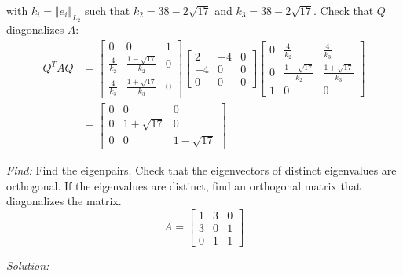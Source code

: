 \documentclass[11pt]{homework}
\begin{document}
with $k_i = \Vert e_i \Vert_{L_2}$
such that $k_2 = 38 -2 \sqrt{17}$ and
$k_3 = 38 - 2 \sqrt{17}$.
Check that $Q$ diagonalizes $A$:
\begin{align*}
Q^T A Q &=
  \begin{bmatrix}
  0 & 0 & 1 \\
  \frac{4}{k_2} & \frac{1-\sqrt{17}}{k_2} & 0 \\
  \frac{4}{k_3} & \frac{1+\sqrt{17}}{k_3} & 0 
  \end{bmatrix}
  \begin{bmatrix}
  2 & -4 & 0 \\
  -4 & 0 & 0 \\
  0 &  0 & 0
  \end{bmatrix}
  \begin{bmatrix}
  0 & \frac{4}{k_2}           & \frac{4}{k_3} \\
  0 & \frac{1- \sqrt{17}}{k_2} & \frac{1+\sqrt{17}}{k_3} \\
  1 & 0 & 0
  \end{bmatrix} \\
  &=
  \begin{bmatrix}
  0 & 0 & 0 \\
  0 & 1+\sqrt{17} & 0 \\
  0 & 0 & 1-\sqrt{17}
  \end{bmatrix}
\end{align*}

\newpage
\question
\emph{Find:}
\newline
Find the eigenpairs.
Check that the eigenvectors of distinct eigenvalues are orthogonal.
If the eigenvalues are distinct, find an orthogonal matrix that diagonalizes the matrix.
\begin{equation*}
A = 
  \begin{bmatrix}
  1 & 3 & 0 \\
  3 & 0 & 1 \\
  0 & 1 & 1
  \end{bmatrix}
\end{equation*}

\emph{Solution:}
\newline
\end{document}
